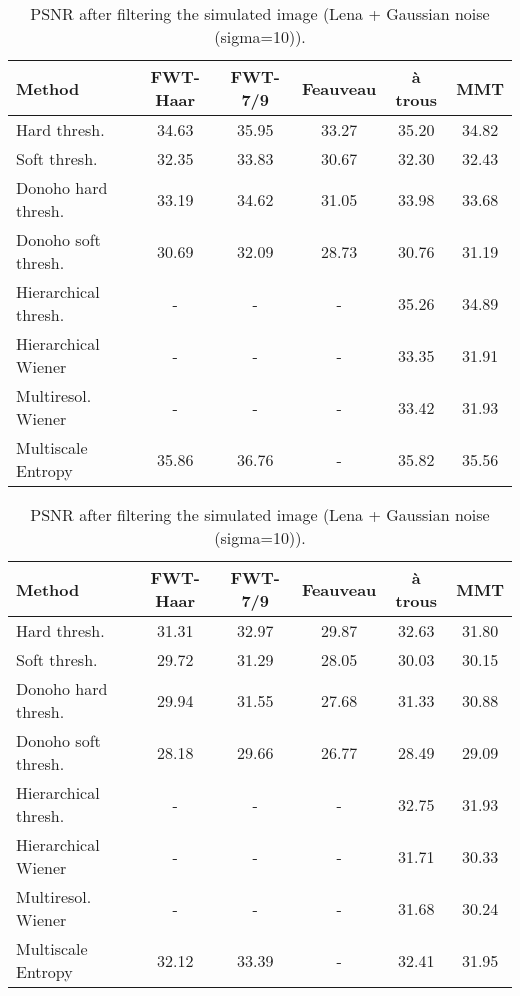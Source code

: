 \begin{table}[hbt]
\begin{center}
\begin{tabular}{lccccc} \hline \hline
Method               & FWT-Haar  & FWT-7/9    & Feauveau & \`a trous & MMT \\ \hline \hline
Hard thresh.         & 34.63 & 35.95 &  33.27   &   35.20  & 34.82  \\
Soft thresh.         & 32.35 & 33.83 &  30.67   &   32.30  & 32.43  \\
Donoho hard thresh.  & 33.19 & 34.62 &  31.05   &   33.98  & 33.68  \\
Donoho soft thresh.  & 30.69 & 32.09 &  28.73   &   30.76  & 31.19  \\
Hierarchical thresh. &     - &  -    &   -      &   35.26  & 34.89  \\
Hierarchical Wiener  &     - &  -    &   -      &   33.35  & 31.91  \\
Multiresol. Wiener   &     - &  -    &   -      &   33.42  & 31.93  \\
Multiscale Entropy   & 35.86 & 36.76 &   -      &   35.82  & 35.56  \\ \hline \hline
\end{tabular}
\caption{PSNR after filtering the simulated image (Lena + Gaussian 
noise (sigma=5)).}
\vspace{0.5cm}


\begin{tabular}{lccccc} \hline \hline
Method               & FWT-Haar  & FWT-7/9    & Feauveau & \`a trous & MMT \\ \hline \hline
Hard thresh.         & 31.31 & 32.97 &  29.87   &  32.63   & 31.80 \\
Soft thresh.         & 29.72 & 31.29 &  28.05   &  30.03   & 30.15 \\
Donoho hard thresh.  & 29.94 & 31.55 &  27.68   &  31.33   & 30.88  \\
Donoho soft thresh.  & 28.18 & 29.66 &  26.77   &  28.49   & 29.09  \\
Hierarchical thresh. &     - &  -    &   -      &  32.75   & 31.93  \\
Hierarchical Wiener  &     - &  -    &   -      &  31.71   & 30.33  \\
Multiresol. Wiener   &     - &  -    &   -      &  31.68   & 30.24  \\
Multiscale Entropy   & 32.12 & 33.39 &   -      &  32.41   & 31.95 \\ \hline \hline
\end{tabular}
\caption{PSNR after filtering the simulated image (Lena + Gaussian
noise (sigma=10)).}
\vspace{0.5cm}



\end{center}
\end{table}
